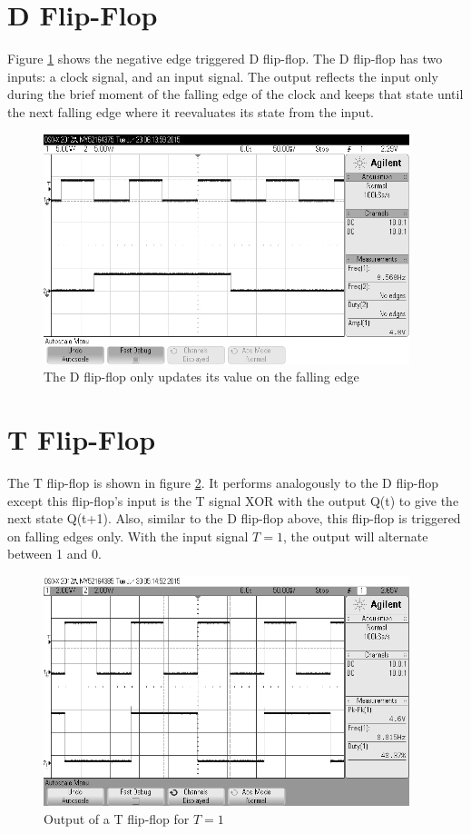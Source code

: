 \documentclass[11pt]{article}
\begin{document}
\section{D Flip-Flop}

Figure \ref{fig:d-ff} shows the negative edge triggered D flip-flop. The D flip-flop has two inputs: a clock signal, and an input signal. The output reflects the input only during the brief moment of the falling edge of the clock and keeps that state until the next falling edge where it reevaluates its state from the input. 

\begin{figure}[htpb]
	\centering
	\includegraphics[width=0.95\textwidth]{d-ff}
	\caption{The D flip-flop only updates its value on the falling edge}
	\label{fig:d-ff}
\end{figure}

\section{T Flip-Flop}

The T flip-flop is shown in figure \ref{fig:t-ff}. It performs analogously to the D flip-flop except this flip-flop's input is the T signal XOR with the output Q(t) to give the next state Q(t+1). Also, similar to the D flip-flop above, this flip-flop is triggered on falling edges only. With the input signal $T = 1$, the output will alternate between 1 and 0.

\begin{figure}[htpb]
	\centering
	\includegraphics[width=0.95\textwidth]{t-ff}
	\caption{Output of a T flip-flop for $T=1$}
	\label{fig:t-ff}
\end{figure}
\end{document}
